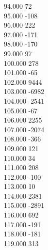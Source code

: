 { 94.000	72 \\
 95.000	-108 \\
 96.000	222 \\
 97.000	-171 \\
 98.000	-170 \\
 99.000	97 \\
 100.000	278 \\
 101.000	-65 \\
 102.000	9444 \\
 103.000	-6982 \\
 104.000	-2541 \\
 105.000	-67 \\
 106.000	2255 \\
 107.000	-2074 \\
 108.000	-366 \\
 109.000	121 \\
 110.000	34 \\
 111.000	208 \\
 112.000	-100 \\
 113.000	10 \\
 114.000	2381 \\
 115.000	-2891 \\
 116.000	692 \\
 117.000	-191 \\
 118.000	-181 \\
 119.000	313 \\
}
